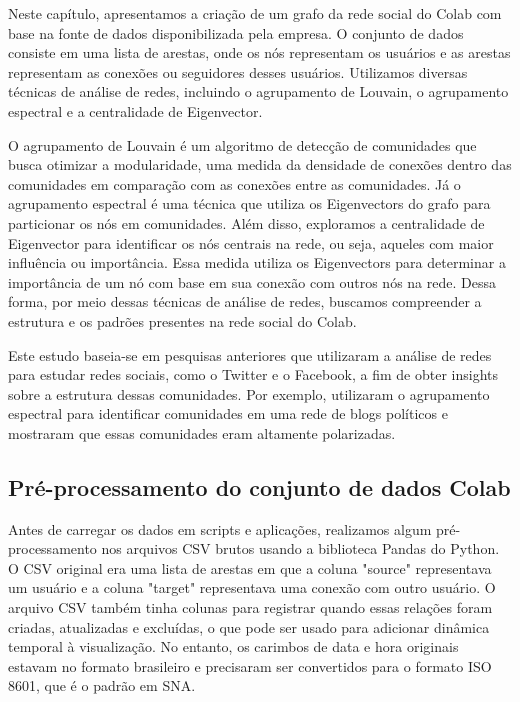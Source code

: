 Neste capítulo, apresentamos a criação de um grafo da rede social do Colab com base na fonte de dados disponibilizada pela empresa. O conjunto de dados consiste em uma lista de arestas, onde os nós representam os usuários e as arestas representam as conexões ou seguidores desses usuários. Utilizamos diversas técnicas de análise de redes, incluindo o agrupamento de Louvain, o agrupamento espectral e a centralidade de Eigenvector.

O agrupamento de Louvain é um algoritmo de detecção de comunidades que busca otimizar a modularidade, uma medida da densidade de conexões dentro das comunidades em comparação com as conexões entre as comunidades. Já o agrupamento espectral é uma técnica que utiliza os Eigenvectors do grafo para particionar os nós em comunidades. Além disso, exploramos a centralidade de Eigenvector para identificar os nós centrais na rede, ou seja, aqueles com maior influência ou importância. Essa medida utiliza os Eigenvectors para determinar a importância de um nó com base em sua conexão com outros nós na rede. Dessa forma, por meio dessas técnicas de análise de redes, buscamos compreender a estrutura e os padrões presentes na rede social do Colab.

Este estudo baseia-se em pesquisas anteriores que utilizaram a análise de redes para estudar redes sociais, como o Twitter e o Facebook, a fim de obter insights sobre a estrutura dessas comunidades. Por exemplo,  utilizaram o agrupamento espectral para identificar comunidades em uma rede de blogs políticos e mostraram que essas comunidades eram altamente polarizadas.

\subsection*{Pré-processamento do conjunto de dados Colab}
\label{sec:preprocessing}

Antes de carregar os dados em scripts e aplicações, realizamos algum pré-processamento nos arquivos CSV brutos usando a biblioteca Pandas do Python. O CSV original era uma lista de arestas em que a coluna "source" representava um usuário e a coluna "target" representava uma conexão com outro usuário. O arquivo CSV também tinha colunas para registrar quando essas relações foram criadas, atualizadas e excluídas, o que pode ser usado para adicionar dinâmica temporal à visualização. No entanto, os carimbos de data e hora originais estavam no formato brasileiro e precisaram ser convertidos para o formato ISO 8601, que é o padrão em SNA.

